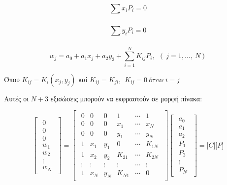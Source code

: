 \begin{equation}
  \sum_{}^{}{x_{i}P_{i}} = 0
\end{equation}

\begin{equation}
  \sum_{}^{}{y_{i}P_{i}} = 0
\end{equation}

\begin{equation}
  w_{j} = a_{0} + a_{1}x_{j} + a_{2}y_{2} + \sum_{i = 1}^{N}K_{ij}P_{i},\ \ (\ j = 1,\ldots,\ N)  
\end{equation}

Όπου $K_{ij} = K_{i}\left( x_{j},y_{j} \right)$ καί
$K_{ij} = K_{ji},\ \ K_{ij} = 0\ \text{όταν}\ i = j$

Αυτές οι $N+3$ εξισώσεις μπορούν να εκφραστούν σε μορφή πίνακα:

\begin{equation}
\begin{bmatrix}
  \begin{array}{c}
    0 \\
    0 \\
    0 \\
    \hline
    w_{1} \\
    w_{2} \\
     \vdots \\
    w_{N}        
  \end{array}
\end{bmatrix} = \begin{bmatrix}
\begin{array}{cccccc}
  0 & 0 & 0 & 1 & \cdots & 1 \\
0 & 0 & 0 & x_{1} & \cdots & x_{N} \\
0 & 0 & 0 & y_{1} & \cdots & y_{N} \\
\hline 
1 & x_{1} & y_{1} & 0 & \cdots & K_{1N} \\
1 & x_{2} & y_{2} & K_{21} & \cdots & K_{2N} \\
 \vdots & \vdots & \vdots & \vdots & \cdots & \vdots \\
1 & x_{N} & y_{N} & K_{N1} & \cdots & 0
\end{array}
\end{bmatrix}
\begin{bmatrix}
  \begin{array}{c}
    a_{0} \\
    a_{1} \\
    a_{2} \\
    \hline
    P_{1} \\
    P_{2} \\
     \vdots \\
    P_{N}
        
  \end{array}
\end{bmatrix} = \lbrack C\rbrack\lbrack P\rbrack
\end{equation}

